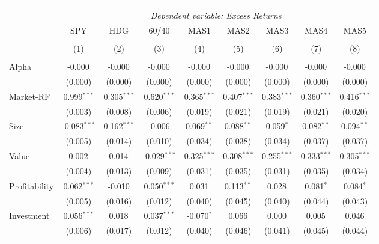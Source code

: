 \begin{table}[!htbp] \centering
\begin{tabular}{@{\extracolsep{5pt}}lcccccccc}
\\[-1.8ex]\hline
\hline \\[-1.8ex]
& \multicolumn{8}{c}{\textit{Dependent variable: Excess Returns}} \
\cr \cline{2-9}
\\[-1.8ex] & \multicolumn{1}{c}{SPY} & \multicolumn{1}{c}{HDG} & \multicolumn{1}{c}{60/40} & \multicolumn{1}{c}{MAS1} & \multicolumn{1}{c}{MAS2} & \multicolumn{1}{c}{MAS3} & \multicolumn{1}{c}{MAS4} & \multicolumn{1}{c}{MAS5}  \\
\\[-1.8ex] & (1) & (2) & (3) & (4) & (5) & (6) & (7) & (8) \\
\hline \\[-1.8ex]
 Alpha & -0.000$^{}$ & -0.000$^{}$ & -0.000$^{}$ & -0.000$^{}$ & -0.000$^{}$ & -0.000$^{}$ & -0.000$^{}$ & -0.000$^{}$ \\
& (0.000) & (0.000) & (0.000) & (0.000) & (0.000) & (0.000) & (0.000) & (0.000) \\
 Market-RF & 0.999$^{***}$ & 0.305$^{***}$ & 0.620$^{***}$ & 0.365$^{***}$ & 0.407$^{***}$ & 0.383$^{***}$ & 0.360$^{***}$ & 0.416$^{***}$ \\
& (0.003) & (0.008) & (0.006) & (0.019) & (0.021) & (0.019) & (0.021) & (0.020) \\
 Size & -0.083$^{***}$ & 0.162$^{***}$ & -0.006$^{}$ & 0.069$^{**}$ & 0.088$^{**}$ & 0.059$^{*}$ & 0.082$^{**}$ & 0.094$^{**}$ \\
& (0.005) & (0.014) & (0.010) & (0.034) & (0.038) & (0.034) & (0.037) & (0.037) \\
 Value & 0.002$^{}$ & 0.014$^{}$ & -0.029$^{***}$ & 0.325$^{***}$ & 0.308$^{***}$ & 0.255$^{***}$ & 0.333$^{***}$ & 0.305$^{***}$ \\
& (0.004) & (0.013) & (0.009) & (0.031) & (0.035) & (0.031) & (0.035) & (0.034) \\
 Profitability & 0.062$^{***}$ & -0.010$^{}$ & 0.050$^{***}$ & 0.031$^{}$ & 0.113$^{**}$ & 0.028$^{}$ & 0.081$^{*}$ & 0.084$^{*}$ \\
& (0.005) & (0.016) & (0.012) & (0.040) & (0.045) & (0.040) & (0.044) & (0.043) \\
 Investment & 0.056$^{***}$ & 0.018$^{}$ & 0.037$^{***}$ & -0.070$^{*}$ & 0.066$^{}$ & 0.000$^{}$ & 0.005$^{}$ & 0.046$^{}$ \\
& (0.006) & (0.017) & (0.012) & (0.040) & (0.046) & (0.041) & (0.045) & (0.044) \\

\end{tabular}
\end{table}
